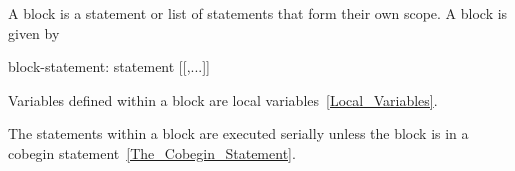 A block is a statement or list of statements that form their own
scope.  A block is given by
\begin{syntax}
block-statement:
  { statement [[,...]] }
\end{syntax}

Variables defined within a block are local
variables~\ref{Local_Variables}.

The statements within a block are executed serially unless the block
is in a cobegin statement~\ref{The_Cobegin_Statement}.
